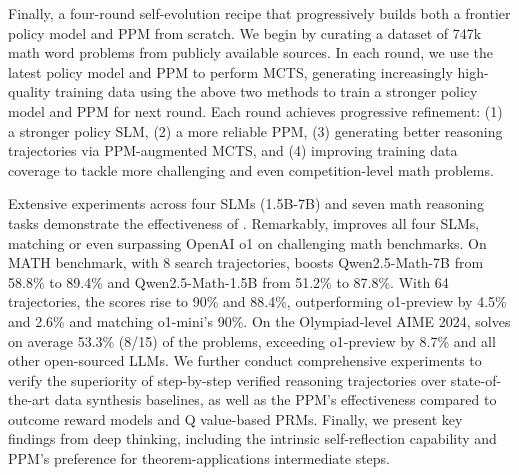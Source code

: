 Finally, a four-round self-evolution recipe that progressively builds both a frontier policy model and PPM from scratch. We begin by curating a dataset of 747k math word problems %
from publicly available sources. In each round, we use the latest policy model and PPM to perform MCTS, generating increasingly high-quality training data using the above two methods to train a stronger policy model and PPM for next round. Each round achieves progressive refinement: (1) a stronger policy SLM, (2) a more reliable PPM, (3) generating better reasoning trajectories via PPM-augmented MCTS, and (4) improving training data coverage to tackle more challenging and even competition-level math problems.




Extensive experiments across four SLMs (1.5B-7B) and seven math reasoning tasks demonstrate the effectiveness of {\sysname}. Remarkably, {\sysname} improves all four SLMs, matching or even surpassing OpenAI o1 on challenging math benchmarks. On MATH benchmark, with 8 search trajectories, {\sysname} boosts Qwen2.5-Math-7B from 58.8\% to 89.4\% and Qwen2.5-Math-1.5B from 51.2\% to 87.8\%. With 64 trajectories, the scores rise to 90\% and 88.4\%, outperforming o1-preview by 4.5\% and 2.6\% and matching o1-mini's 90\%. On the Olympiad-level AIME 2024, {\sysname} solves on average 53.3\% (8/15) of the problems, exceeding o1-preview by 8.7\% and all other open-sourced LLMs. We further conduct comprehensive experiments to verify the superiority of step-by-step verified reasoning trajectories over state-of-the-art data synthesis baselines, as well as the PPM's effectiveness compared to outcome reward models and Q value-based PRMs. Finally, we present key findings from {\sysname} deep thinking, including the intrinsic self-reflection capability and PPM's preference for theorem-applications intermediate steps.  























